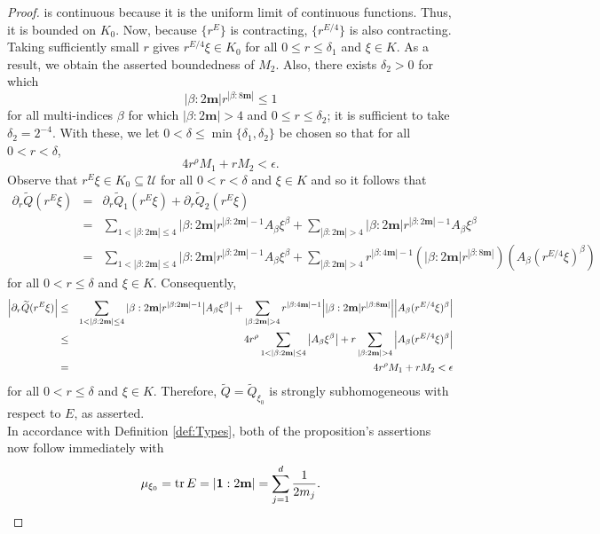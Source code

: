 \documentclass[11pt, letter]{book}
\begin{document}
\begin{proof}
is continuous because it is the uniform limit of continuous functions. Thus, it is bounded on $K_0$. Now, because $\{r^E\}$ is contracting, $\{ r^{E/4} \}$ is also contracting. Taking sufficiently small $r$ gives $r^{E/4}\xi \in K_0$ for all $0 \leq r \leq \delta_1$ and $\xi \in K$. As a result, we obtain the asserted boundedness of $M_2$. Also, there exists $\delta_2>0$ for which
\begin{equation*}
    |\beta:2\mathbf{m}|r^{|\beta:8\mathbf{m}|}\leq 1
\end{equation*}
for all multi-indices $\beta$ for which $|\beta:2\mathbf{m}|> 4$ and $0\leq r\leq \delta_2$; it is sufficient to take $\delta_2 = 2^{-4}$. With these, we let $0<\delta\leq\min\{\delta_1,\delta_2\}$ be chosen so that for all $0 < r < \delta$,
\begin{equation*}
    4r^\rho M_1+r M_2<\epsilon. 
\end{equation*}
Observe that $r^{E}\xi\in K_0\subseteq\mathcal{U}$ for all $0<r<\delta$ and $\xi\in K$ and so it follows that
\begin{eqnarray*}
    \partial_r\widetilde{Q}(r^E\xi)&=&\partial_r\widetilde{Q}_1(r^E\xi)+\partial_r\widetilde{Q}_2(r^E\xi)\\
    &=&\sum_{1<|\beta:2\mathbf{m}|\leq 4}|\beta:2\mathbf{m}|r^{|\beta:2\mathbf{m}|-1}A_\beta\xi^\beta+\sum_{|\beta:2\mathbf{m}|> 4}|\beta:2\mathbf{m}|r^{|\beta:2\mathbf{m}|-1}A_\beta\xi^\beta\\
    &=&\sum_{1<|\beta:2\mathbf{m}|\leq 4}|\beta:2\mathbf{m}|r^{|\beta:2\mathbf{m}|-1}A_\beta\xi^\beta+\sum_{|\beta:2\mathbf{m}|>4} r^{|\beta:4\mathbf{m}|-1}\left(|\beta:2\mathbf{m}|r^{|\beta:8\mathbf{m}|}\right)\left(A_\beta (r^{E/4}\xi)^\beta\right)
\end{eqnarray*}
for all $0<r\leq\delta$ and $\xi\in K$. Consequently,
\begin{eqnarray*}
    \abs{\partial_r\widetilde{Q}(r^E\xi)}&\leq & \sum_{1<|\beta:2\mathbf{m}|\leq 4}|\beta:2\mathbf{m}|r^{|\beta:2\mathbf{m}|-1}\abs{A_\beta\xi^\beta}+\sum_{|\beta:2\mathbf{m}|>4}r^{|\beta:4\mathbf{m}|-1}\abs{|\beta:2\mathbf{m}|r^{|\beta:8\mathbf{m}|}}\abs{A_\beta (r^{E/4}\xi)^\beta}\\
    &\leq&4 r^\rho \sum_{1<|\beta:2\mathbf{m}|\leq 4}\abs{A_\beta \xi^\beta}+r\sum_{|\beta:2\mathbf{m}|>4}\abs{A_\beta(r^{E/4}\xi)^\beta}\\
    &=&4 r^\rho M_1+rM_2<\epsilon
\end{eqnarray*}
for all $0<r\leq\delta$ and $\xi\in K$. Therefore, $\widetilde{Q}=\widetilde{Q}_{\xi_0}$ is strongly subhomogeneous with respect to $E$, as asserted. \\

\noindent In accordance with Definition \ref{def:Types}, both of the proposition's assertions now follow immediately with
\begin{equation*}
    \mu_{\xi_0}=\tr E=|\mathbf{1}:2\mathbf{m}|=\sum_{j=1}^d\frac{1}{2m_j}.
\end{equation*}




\end{proof}
\end{document}

